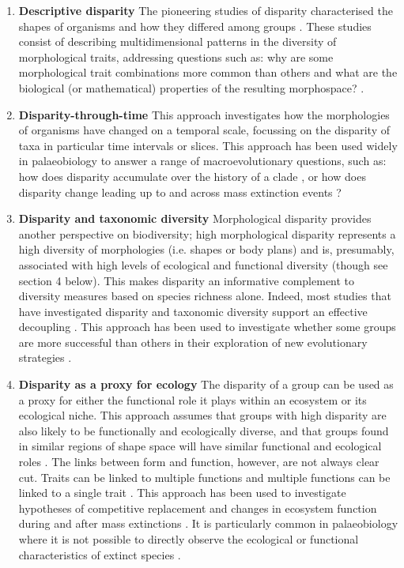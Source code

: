 \documentclass[12pt,letterpaper]{article}
\begin{document}
\begin{enumerate}

	\item \textbf{Descriptive disparity} The pioneering studies of disparity characterised the shapes of organisms and how they differed among groups \citep{Foote1995-do, Briggs1992-pd}.
	These studies consist of describing multidimensional patterns in the diversity of morphological traits, addressing questions such as: why are some morphological trait combinations more common than others and what are the biological (or mathematical) properties of the resulting morphospace? \citep{Foote1995-do, Raup1961-vx, Gerber2017-xi}.

	\item \textbf{Disparity-through-time} This approach investigates how the morphologies of organisms have changed on a temporal scale, focussing on the disparity of taxa in particular time intervals or slices.
	This approach has been used widely in palaeobiology to answer a range of macroevolutionary questions, such as: how does disparity accumulate over the history of a clade \citep{Guillerme2018-uj, Wright2017-jo}, or how does disparity change leading up to and across mass extinction events \citep{Friedman2010-ve}?

	\item \textbf{Disparity and taxonomic diversity} Morphological disparity provides another perspective on biodiversity; high morphological disparity represents a high diversity of morphologies (i.e. shapes or body plans) and is, presumably, associated with high levels of ecological and functional diversity (though see section 4 below).
	This makes disparity an informative complement to diversity measures based on species richness alone. Indeed, most studies that have investigated disparity and taxonomic diversity support an effective decoupling 
	\citep[e.g.][]{Fortey1996-kt, Moyne2007-jm, Ruta2013-iy, Hopkins2013-xt}.
	This approach has been used to investigate whether some groups are more successful than others in their exploration of new evolutionary strategies \citep{Losos2011-fq}.

	\item \textbf{Disparity as a proxy for ecology} The disparity of a group can be used as a proxy for either the functional role it plays within an ecosystem or its ecological niche.
	This approach assumes that groups with high disparity are also likely to be functionally and ecologically diverse, and that groups found in similar regions of shape space will have similar functional and ecological roles
	\citep{Friedman2010-ve, Pierce2008-yr, Anderson2013-zt}.
	The links between form and function, however, are not always clear cut.
	Traits can be linked to multiple functions and multiple functions can be linked to a single trait \citep{Wainwright2005-or}.
	This approach has been used to investigate hypotheses of competitive replacement \citep{Brusatte2008-vx} and changes in ecosystem function during and after mass extinctions \citep{Friedman2010-ve}.
	It is particularly common in palaeobiology where it is not possible to directly observe the ecological or functional characteristics of extinct species \citep{Wainwright2005-or}.


\end{enumerate}
\end{document}
